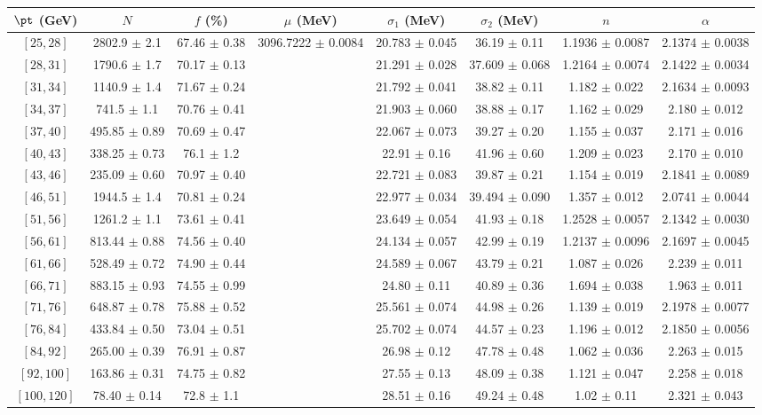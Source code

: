 \begin{tabular}{c||c|c|c|c|c|c|c}
$\pt$ (GeV) & $N$ & $f$ (\%) & $\mu$ (MeV) & $\sigma_1$ (MeV) & $\sigma_2$ (MeV) & $n$ & $\alpha$ \\
\hline
$[25, 28]$ & 2802.9 $\pm$ 2.1 & 67.46 $\pm$ 0.38 & \multirow{17}{*}{3096.7222 $\pm$ 0.0084} & 20.783 $\pm$ 0.045 & 36.19 $\pm$ 0.11 & 1.1936 $\pm$ 0.0087 & 2.1374 $\pm$ 0.0038\\
$[28, 31]$ & 1790.6 $\pm$ 1.7 & 70.17 $\pm$ 0.13 &  & 21.291 $\pm$ 0.028 & 37.609 $\pm$ 0.068 & 1.2164 $\pm$ 0.0074 & 2.1422 $\pm$ 0.0034\\
$[31, 34]$ & 1140.9 $\pm$ 1.4 & 71.67 $\pm$ 0.24 &  & 21.792 $\pm$ 0.041 & 38.82 $\pm$ 0.11 & 1.182 $\pm$ 0.022 & 2.1634 $\pm$ 0.0093\\
$[34, 37]$ & 741.5 $\pm$ 1.1 & 70.76 $\pm$ 0.41 &  & 21.903 $\pm$ 0.060 & 38.88 $\pm$ 0.17 & 1.162 $\pm$ 0.029 & 2.180 $\pm$ 0.012\\
$[37, 40]$ & 495.85 $\pm$ 0.89 & 70.69 $\pm$ 0.47 &  & 22.067 $\pm$ 0.073 & 39.27 $\pm$ 0.20 & 1.155 $\pm$ 0.037 & 2.171 $\pm$ 0.016\\
$[40, 43]$ & 338.25 $\pm$ 0.73 & 76.1 $\pm$ 1.2 &  & 22.91 $\pm$ 0.16 & 41.96 $\pm$ 0.60 & 1.209 $\pm$ 0.023 & 2.170 $\pm$ 0.010\\
$[43, 46]$ & 235.09 $\pm$ 0.60 & 70.97 $\pm$ 0.40 &  & 22.721 $\pm$ 0.083 & 39.87 $\pm$ 0.21 & 1.154 $\pm$ 0.019 & 2.1841 $\pm$ 0.0089\\
$[46, 51]$ & 1944.5 $\pm$ 1.4 & 70.81 $\pm$ 0.24 &  & 22.977 $\pm$ 0.034 & 39.494 $\pm$ 0.090 & 1.357 $\pm$ 0.012 & 2.0741 $\pm$ 0.0044\\
$[51, 56]$ & 1261.2 $\pm$ 1.1 & 73.61 $\pm$ 0.41 &  & 23.649 $\pm$ 0.054 & 41.93 $\pm$ 0.18 & 1.2528 $\pm$ 0.0057 & 2.1342 $\pm$ 0.0030\\
$[56, 61]$ & 813.44 $\pm$ 0.88 & 74.56 $\pm$ 0.40 &  & 24.134 $\pm$ 0.057 & 42.99 $\pm$ 0.19 & 1.2137 $\pm$ 0.0096 & 2.1697 $\pm$ 0.0045\\
$[61, 66]$ & 528.49 $\pm$ 0.72 & 74.90 $\pm$ 0.44 &  & 24.589 $\pm$ 0.067 & 43.79 $\pm$ 0.21 & 1.087 $\pm$ 0.026 & 2.239 $\pm$ 0.011\\
$[66, 71]$ & 883.15 $\pm$ 0.93 & 74.55 $\pm$ 0.99 &  & 24.80 $\pm$ 0.11 & 40.89 $\pm$ 0.36 & 1.694 $\pm$ 0.038 & 1.963 $\pm$ 0.011\\
$[71, 76]$ & 648.87 $\pm$ 0.78 & 75.88 $\pm$ 0.52 &  & 25.561 $\pm$ 0.074 & 44.98 $\pm$ 0.26 & 1.139 $\pm$ 0.019 & 2.1978 $\pm$ 0.0077\\
$[76, 84]$ & 433.84 $\pm$ 0.50 & 73.04 $\pm$ 0.51 &  & 25.702 $\pm$ 0.074 & 44.57 $\pm$ 0.23 & 1.196 $\pm$ 0.012 & 2.1850 $\pm$ 0.0056\\
$[84, 92]$ & 265.00 $\pm$ 0.39 & 76.91 $\pm$ 0.87 &  & 26.98 $\pm$ 0.12 & 47.78 $\pm$ 0.48 & 1.062 $\pm$ 0.036 & 2.263 $\pm$ 0.015\\
$[92, 100]$ & 163.86 $\pm$ 0.31 & 74.75 $\pm$ 0.82 &  & 27.55 $\pm$ 0.13 & 48.09 $\pm$ 0.38 & 1.121 $\pm$ 0.047 & 2.258 $\pm$ 0.018\\
$[100, 120]$ & 78.40 $\pm$ 0.14 & 72.8 $\pm$ 1.1 &  & 28.51 $\pm$ 0.16 & 49.24 $\pm$ 0.48 & 1.02 $\pm$ 0.11 & 2.321 $\pm$ 0.043\\
\end{tabular}
